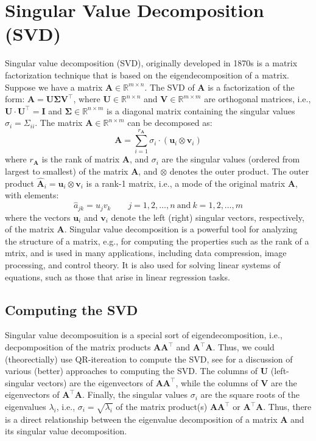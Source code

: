 \documentclass{article}[11pt]
\def\R{\mathbb{R}}
\begin{document}
\section{Singular Value Decomposition (SVD)}
Singular value decomposition (SVD), originally developed in 1870s \citep{Stewart:1993} is a matrix factorization technique that is based on the eigendecomposition of a matrix.
Suppose we have a matrix $\mathbf{A} \in \R^{m \times n}$. The SVD of $\mathbf{A}$ is a factorization of the form: $\mathbf{A} = \mathbf{U}\mathbf{\Sigma}\mathbf{V}^{\top}$, where
$\mathbf{U}\in\mathbb{R}^{n\times{n}}$ and $\mathbf{V}\in\mathbb{R}^{m\times{m}}$ are orthogonal matrices, i.e., $\mathbf{U}\cdot\mathbf{U}^{\top} = \mathbf{I}$ and $\mathbf{\Sigma}\in\mathbb{R}^{n\times{m}}$ is a diagonal matrix containing 
the singular values $\sigma_{i}=\Sigma_{ii}$. The matrix $\mathbf{A}\in\mathbb{R}^{n\times{m}}$ can be decomposed as:
\begin{equation}
\mathbf{A} = \sum_{i=1}^{r_{\mathbf{A}}}\sigma_{i}\cdot\left(\mathbf{u}_{i}\otimes\mathbf{v}_{i}\right)
\end{equation}
where $r_{\mathbf{A}}$ is the rank of matrix $\mathbf{A}$, and $\sigma_{i}$ are the singular values (ordered from largest to smallest) of the matrix $\mathbf{A}$,
and $\otimes$ denotes the outer product. 
The outer product $\hat{\mathbf{A}}_{i} = \mathbf{u}_{i}\otimes\mathbf{v}_{i}$ is a rank-1 matrix, i.e., a mode of the original matrix $\mathbf{A}$,  with elements: 
\begin{equation}
\hat{a}_{jk} = u_{j}v_{k}\qquad{j=1,2,\dots,n~\text{and}~k=1,2,\dots,m}
\end{equation}
where the vectors $\mathbf{u}_{i}$ and $\mathbf{v}_{i}$ denote the left (right) singular vectors, respectively, of the matrix $\mathbf{A}$.
Singular value decomposition is a powerful tool for analyzing the structure of a matrix, e.g., for computing the properties such as the rank of a mtrix, and is used in many applications, 
including data compression, image processing, and control theory. It is also used for solving linear systems of equations,
such as those that arise in linear regression tasks.

\subsection{Computing the SVD}
Singular value decomposuition is a special sort of eigendecomposition, i.e., decpomposition of the matrix products $\mathbf{A}\mathbf{A}^{\top}$ and $\mathbf{A}^{\top}\mathbf{A}$.
Thus, we could (theorectially) use QR-itereation to compute the SVD, see \citep{Cline2006ComputationOT} for a discussion of various (better) approaches to computing the SVD.
The columns of $\mathbf{U}$ (left-singular vectors) are the eigenvectors of $\mathbf{A}\mathbf{A}^{\top}$, 
while the columns of $\mathbf{V}$ are the eigenvectors of $\mathbf{A}^{\top}\mathbf{A}$.
Finally, the singular values $\sigma_{i}$ are the square roots of the eigenvalues $\lambda_{i}$, i.e., $\sigma_{i} = \sqrt{\lambda_{i}}$ of the matrix product(s) $\mathbf{A}\mathbf{A}^{\top}$ or $\mathbf{A}^{\top}\mathbf{A}$. 
Thus, there is a direct relationship between the eigenvalue decomposition of a matrix $\mathbf{A}$ and its singular value decomposition.
\end{document}
